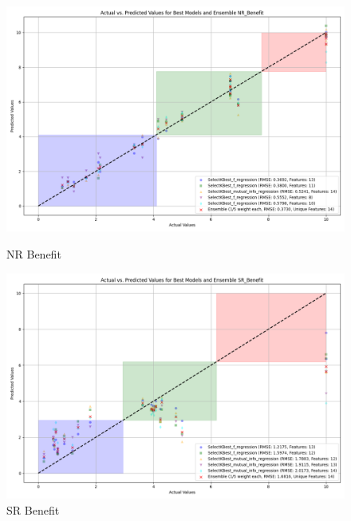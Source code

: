 \begin{figure}[H]
    \centering
    \begin{minipage}{0.45\textwidth}
        \centering
        \includegraphics[width=\linewidth]{reg_section_specific/images_reg_featred_ensemble/actual_vs_predicted_best_feature_selection_and_ensemble_NR_Benefit.png}
        \caption{NR Benefit}
        \label{fig_reg_spec:nr_ben_reg_featred_best_ensemble}
    \end{minipage}\hfill
    \begin{minipage}{0.45\textwidth}
        \centering
        \includegraphics[width=\linewidth]{reg_section_specific/images_reg_featred_ensemble/actual_vs_predicted_best_feature_selection_and_ensemble_SR_Benefit.png}
        \caption{SR Benefit}
        \label{fig_reg_spec:sr_ben_reg_featred_best_ensemble}
    \end{minipage}
\end{figure}

